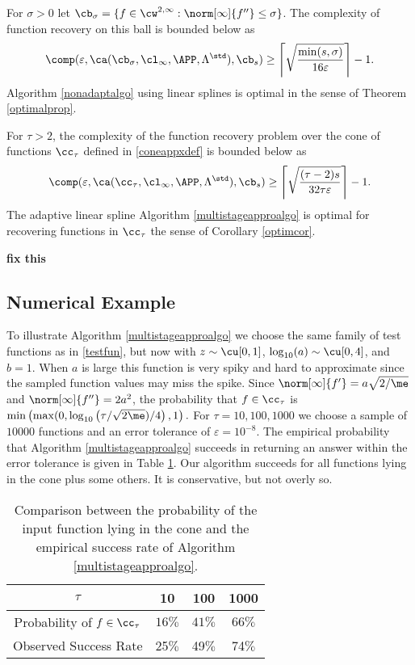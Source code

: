 \begin{theorem} \label{complowbdappr} For $\sigma>0$ let $\cb_{\sigma}=\{f \in \cw^{2,\infty} : \norm[\infty]{f''} \le \sigma\}$.  The complexity of function recovery on this ball is bounded below as
\begin{equation*}
\comp(\varepsilon,\ca(\cb_{\sigma},\cl_\infty,\APP,\Lambda^{\std}),\cb_{s}) \ge \left \lceil \sqrt{\frac{\min(s,\sigma)}{16 \varepsilon}} \right \rceil -1 .
\end{equation*}
Algorithm \ref{nonadaptalgo} using linear splines is optimal in the sense of Theorem \ref{optimalprop}.

For $\tau>2$, the complexity of the function recovery problem over the cone of functions $\cc_{\tau}$ defined in \eqref{coneappxdef} is bounded below as
\begin{equation*}
\comp(\varepsilon,\ca(\cc_{\tau},\cl_\infty,\APP,\Lambda^{\std}),\cb_{s}) \ge \left \lceil \sqrt{\frac{(\tau-2)s}{32 \tau \varepsilon}} \right \rceil-1 .
\end{equation*}
The adaptive linear spline Algorithm \ref{multistageapproalgo} is optimal for recovering functions in $\cc_{\tau}$ the sense of Corollary \ref{optimcor}.
\end{theorem}

{\bf fix this}



\subsection{Numerical Example}

To illustrate Algorithm \ref{multistageapproalgo} we choose the same  family of test functions as in \eqref{testfun}, but now with $z \sim \cu[0,1]$, $\log_{10}(a) \sim \cu[0,4]$, and $b=1$. When $a$ is large this function is very spiky and hard to approximate since the sampled function values may miss the spike.  Since $\norm[\infty]{f'}=a\sqrt{2/\me}$ and $\norm[\infty]{f''}=2a^2$, the probability that $f \in \cc_{\tau}$ is $\min\left(\max(0,\log_{10}\left(\tau/\sqrt{2\me})/4\right),1\right).$
For $\tau = 10, 100 , 1000$ we choose a sample of  $10000$ functions and an error tolerance of  $\varepsilon = 10^{-8}$.  The empirical probability that Algorithm \ref{multistageapproalgo} succeeds in returning an answer within the error tolerance is given in Table \ref{approxnumerical}.  Our algorithm succeeds for all functions lying in the cone plus some others.  It is conservative, but not overly so.
\begin{table}[h]
\centering
\begin{tabular}{cccc}
$\tau$ &  10 & 100 & 1000\\
\toprule
Probability of $f \in \cc_{\tau}$ &  $ 16 \%$ &  $41 \%$  & $66 \%$ \\
Observed Success Rate & 25$\%$ &  49$\%$  & 74$\%$ \\
\end{tabular}
\caption{Comparison between the probability of the input function lying in the cone and the empirical success rate of Algorithm \ref{multistageapproalgo}.  \label{approxnumerical}}
\end{table}




